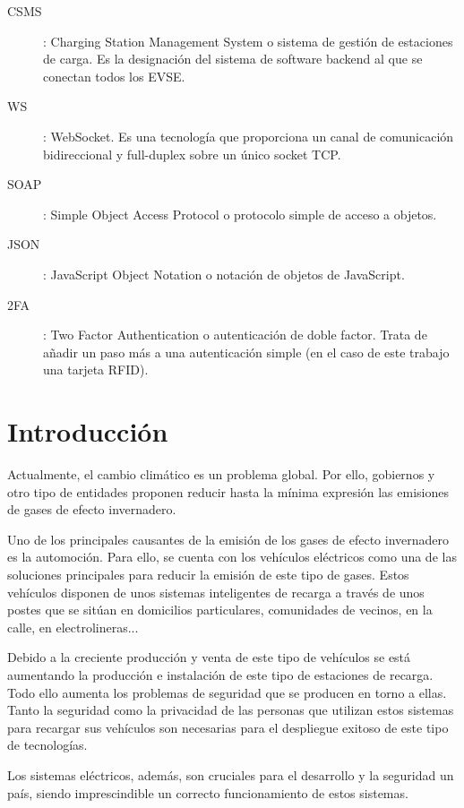 \documentclass[12pt,a4paper,onecolumn,oneside]{report}
\newcommand{\mychapter}[2]{
	\setcounter{chapter}{#1}
	\setcounter{section}{1}
	\chapter*{#2}
	\addcontentsline{toc}{chapter}{#2}
}
\begin{document}
\begin{description}
	\item[CSMS]: Charging Station Management System o sistema de gestión de estaciones de carga. Es la designación del sistema de software backend al que se conectan todos los EVSE.
	\item[WS]: WebSocket. Es una tecnología que proporciona un canal de comunicación bidireccional y full-duplex sobre un único socket TCP.
	\item[SOAP]: Simple Object Access Protocol o protocolo simple de acceso a objetos.
	\item[JSON]: JavaScript Object Notation o notación de objetos de JavaScript.
	\item[2FA]: Two Factor Authentication o autenticación de doble factor. Trata de añadir un paso más a una autenticación simple (en el caso de este trabajo una tarjeta RFID).




	
	
\end{description} 

\newpage
\renewcommand{\thepage}{\arabic{page}}
\setcounter{page}{1} %

\mychapter{0}{Introducción}
\label{Introducción}

Actualmente, el cambio climático es un problema global. Por ello, gobiernos y otro tipo de entidades proponen reducir hasta la mínima expresión las emisiones de gases de efecto invernadero.

Uno de los principales causantes de la emisión de los gases de efecto invernadero es la automoción. Para ello, se cuenta con los vehículos eléctricos como una de las soluciones principales para reducir la emisión de este tipo de gases. Estos vehículos disponen de unos sistemas inteligentes de recarga a través de unos postes que se sitúan en domicilios particulares, comunidades de vecinos, en la calle, en electrolineras...

Debido a la creciente producción y venta de este tipo de vehículos se está aumentando la producción e instalación de este tipo de estaciones de recarga. Todo ello aumenta los problemas de seguridad que se producen en torno a ellas. Tanto la seguridad como la privacidad de las personas que utilizan estos sistemas para recargar sus vehículos son necesarias para el despliegue exitoso de este tipo de tecnologías.

Los sistemas eléctricos, además, son cruciales para el desarrollo y la seguridad un país, siendo imprescindible un correcto funcionamiento de estos sistemas. 
\end{document}
